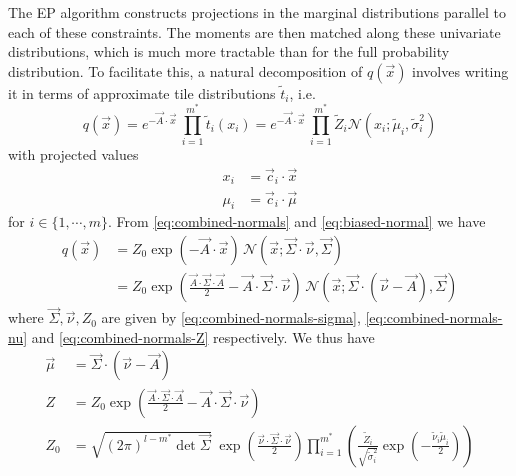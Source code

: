 \documentclass[11pt,twoside]{report}
\begin{document}
The EP algorithm constructs projections in the marginal distributions parallel to each of these constraints.
The moments are then matched along these univariate distributions, which is much more tractable than for the full probability distribution.
To facilitate this, a natural decomposition of $q(\vec{x})$ involves writing it in terms of approximate tile distributions $\widetilde{t}_i$, i.e.\
\begin{equation}
  q(\vec{x})
  =
  e^{-\vec{A} \cdot \vec{x}} \,
  \prod_{i=1}^{m^*} \widetilde{t}_i (x_i)
  =
  e^{-\vec{A} \cdot \vec{x}} \,
  \prod_{i=1}^{m^*} \widetilde{Z}_i \mathcal{N}(x_i; \widetilde{\mu}_i, \widetilde{\sigma}_i^2)
\end{equation}
with projected values
\begin{subequations}
  \begin{align}
    x_i &= \vec{c}_i \cdot \vec{x} \\
    \mu_i &= \vec{c}_i \cdot \vec{\mu}
  \end{align}
\end{subequations}
for $i \in \{1,\cdots,m\}$.
From \eqref{eq:combined-normals} and \eqref{eq:biased-normal} we have
\begin{equation}
  \begin{split}
    q(\vec{x}) &=
    Z_0
    \exp{\left( -\vec{A} \cdot \vec{x} \right)} \,
    \mathcal{N}(\vec{x}; \vec{\Sigma} \cdot \vec{\nu}, \vec{\Sigma}) \\
    &=
    Z_0
    \exp{\left( \frac{\vec{A} \cdot \vec{\Sigma} \cdot \vec{A}}{2} - \vec{A} \cdot \vec{\Sigma} \cdot{\vec{\nu}} \right)} \,
    \mathcal{N}(\vec{x}; \vec{\Sigma} \cdot (\vec{\nu} - \vec{A}), \vec{\Sigma})
  \end{split}
\end{equation}
where $\vec{\Sigma}, \vec{\nu}, Z_0$ are given by \eqref{eq:combined-normals-sigma}, \eqref{eq:combined-normals-nu} and \eqref{eq:combined-normals-Z} respectively.
We thus have
\begin{subequations}
  \begin{align}
    \vec{\mu} &= \vec{\Sigma} \cdot (\vec{\nu} - \vec{A})
    \\
    Z &= Z_0
    \exp{\left( \frac{\vec{A} \cdot \vec{\Sigma} \cdot \vec{A}}{2} - \vec{A} \cdot \vec{\Sigma} \cdot \vec{\nu} \right)}
    \\
    Z_0 &=
    \sqrt{ (2\pi)^{l-m^*} \det{\vec{\Sigma}} }
    \;
    \exp{\left( \frac{\vec{\nu} \cdot \vec{\Sigma} \cdot \vec{\nu}}{2} \right)}
    \prod_{i=1}^{m^*}
    \left(
    \frac{\widetilde{Z}_i}{\sqrt{ \widetilde{\sigma}_i^2 }}
    \exp{\left(-\frac{\widetilde{\nu}_i \widetilde{\mu}_i}{2}\right)}
    \right)
  \end{align}
\end{subequations}
\end{document}
